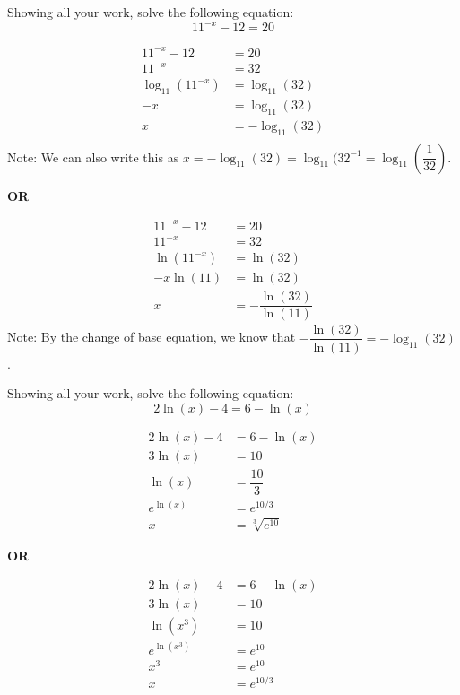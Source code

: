 \documentclass[11pt,letterpaper]{article}
\begin{document}
 Showing all your work, solve the following equation: 
	\[
	11^{-x} - 12= 20
	\] \pspace

\sol
	\[
	\begin{aligned}
	11^{-x} - 12&= 20 \\[0.3cm]
	11^{-x}&= 32 \\[0.3cm]
	\log_{11}(11^{-x})&= \log_{11}(32) \\[0.3cm]
	-x&= \log_{11}(32) \\[0.3cm]
	x&= -\log_{11}(32) \\[0.3cm]
	\end{aligned}
	\] 
Note: We can also write this as $x= -\log_{11}(32)= \log_{11}(32^{-1}= \log_{11} \left( \dfrac{1}{32} \right)$. 

\begin{center} {\bfseries OR} \end{center}
	\[
	\begin{aligned}
	11^{-x} - 12&= 20 \\[0.3cm]
	11^{-x}&= 32 \\[0.3cm]
	\ln(11^{-x})&= \ln(32) \\[0.3cm]
	-x \ln(11)&= \ln(32) \\[0.3cm]
	x&= -\dfrac{\ln(32)}{\ln(11)}
	\end{aligned}
	\] 
Note: By the change of base equation, we know that $-\dfrac{\ln(32)}{\ln(11)}= -\log_{11}(32)$. 



\newpage



 Showing all your work, solve the following equation: 
	\[
	2\ln(x) - 4= 6 - \ln(x)
	\] \pspace

\sol
	\[
	\begin{aligned}
	2\ln(x) - 4&= 6 - \ln(x) \\[0.3cm]
	3\ln(x)&= 10 \\[0.3cm]
	\ln(x)&= \dfrac{10}{3} \\[0.3cm]
	e^{\ln(x)}&= e^{10/3} \\[0.3cm]
	x&= \sqrt[3]{e^{10}}
	\end{aligned}
	\] 

\begin{center} {\bfseries OR} \end{center}

	\[
	\begin{aligned}
	2\ln(x) - 4&= 6 - \ln(x) \\[0.3cm]
	3\ln(x)&= 10 \\[0.3cm]
	\ln(x^3)&= 10 \\[0.3cm]
	e^{\ln(x^3)}&= e^{10} \\[0.3cm]
	x^3&= e^{10} \\[0.3cm]
	x&= e^{10/3}
	\end{aligned}
	\] 
\end{document}

